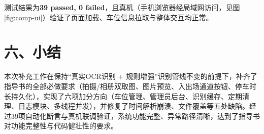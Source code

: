 \documentclass[12pt,a4paper]{article}
\begin{document}
测试结果为\textbf{39 passed, 0 failed}，且真机（手机浏览器经局域网访问，见图\ref{fig:comp-ui}）验证了页面加载、车位信息拉取与整体交互均正常。

\section*{六、小结}
本次补充工作在保持“真实OCR识别 + 规则增强”识别管线不变的前提下，补齐了指导书的全部必做要求（拍摄/相册双取图、图片预览、入出场通道按钮、停车时长持久化），实现了六项加分方向（车位管理、管理员后台、识别缓存、定期清理、日志模块、多线程并发），并修复了时间解析崩溃、文件覆盖等五处缺陷。经过39项自动化断言与真机联调验证，系统功能完整、异常路径清晰，达到了指导书对功能完整性与代码健壮性的要求。
\end{document}

